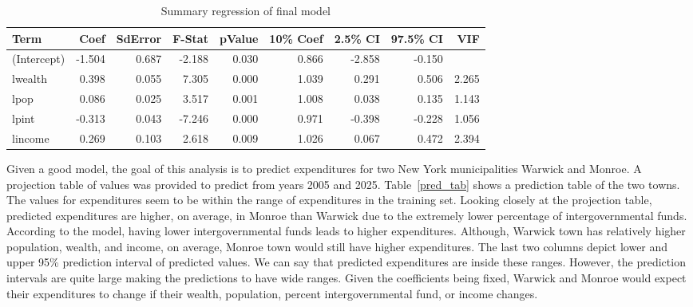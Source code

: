 \documentclass[11pt]{article}\usepackage[]{graphicx}\usepackage[]{color}
\begin{document}
\begin{center}
\begin{table}[ht]
\centering
\begin{tabular}{lrrrrrrrr}
  \hline
Term & Coef & SdError & F-Stat & pValue & 10\% Coef & 2.5\% CI & 97.5\% CI & VIF \\ 
  \hline
(Intercept) & -1.504 & 0.687 & -2.188 & 0.030 & 0.866 & -2.858 & -0.150 &  \\ 
  lwealth & 0.398 & 0.055 & 7.305 & 0.000 & 1.039 & 0.291 & 0.506 & 2.265 \\ 
  lpop & 0.086 & 0.025 & 3.517 & 0.001 & 1.008 & 0.038 & 0.135 & 1.143 \\ 
  lpint & -0.313 & 0.043 & -7.246 & 0.000 & 0.971 & -0.398 & -0.228 & 1.056 \\ 
  lincome & 0.269 & 0.103 & 2.618 & 0.009 & 1.026 & 0.067 & 0.472 & 2.394 \\ 
   \hline
\end{tabular}
\caption{Summary regression of final model} 
\label{reg_summary_final}
\end{table}

\end{center}

\noindent Given a good model, the goal of this analysis is to predict expenditures for two New York municipalities Warwick and Monroe. A projection table of values was provided to predict from years 2005 and 2025. Table~\ref{pred_tab} shows a prediction table of the two towns. The values for expenditures seem to be within the range of expenditures in the training set. Looking closely at the projection table, predicted expenditures are higher, on average, in Monroe than Warwick due to the extremely lower percentage of intergovernmental funds. According to the model, having lower intergovernmental funds leads to higher expenditures. Although, Warwick town has relatively higher population, wealth, and income, on average, Monroe town would still have higher expenditures. The last two columns depict lower and upper 95\% prediction interval of predicted values. We can say that predicted expenditures are inside these ranges. However, the prediction intervals are quite large making the predictions to have wide ranges. Given the coefficients being fixed, Warwick and Monroe would expect their expenditures to change if their wealth, population, percent intergovernmental fund, or income changes.    
\end{document}
